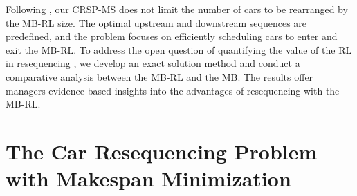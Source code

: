 \documentclass[12pt]{article}
\begin{document}
Following \citet{guo2025logic}, our CRSP-MS does not limit the number of cars to be rearranged by the MB-RL size. The optimal upstream and downstream sequences are predefined, and the problem focuses on efficiently scheduling cars to enter and exit the MB-RL. To address the open question of quantifying the value of the RL in resequencing \citep{boysen2012resequencing}, we develop an exact solution method and conduct a comparative analysis between the MB-RL and the MB. The results offer managers evidence-based insights into the advantages of resequencing with the MB-RL.



\section{The Car Resequencing Problem with Makespan Minimization}\label{sec3}



\end{document}
